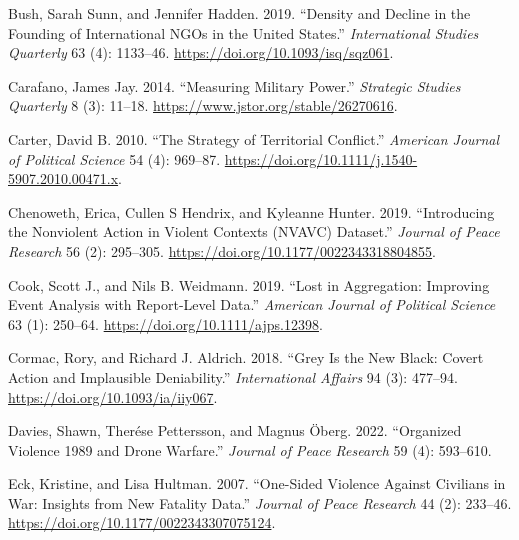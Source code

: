 \documentclass{article}
\newlength{\cslhangindent}
\newlength{\cslentryspacingunit} %
\newenvironment{CSLReferences}[2] %
 {%
  \setlength{\parindent}{0pt}
  \ifodd #1
  \let\oldpar\par
  \def\par{\hangindent=\cslhangindent\oldpar}
  \fi
  \setlength{\parskip}{#2\cslentryspacingunit}
 }%
 {}
\begin{document}
\begin{CSLReferences}{1}{0}
\leavevmode{}%
Bush, Sarah Sunn, and Jennifer Hadden. 2019. {``Density and {Decline} in
the {Founding} of {International NGOs} in the {United States}.''}
\emph{International Studies Quarterly} 63 (4): 1133--46.
\url{https://doi.org/10.1093/isq/sqz061}.

\leavevmode{}%
Carafano, James Jay. 2014. {``Measuring {Military Power}.''}
\emph{Strategic Studies Quarterly} 8 (3): 11--18.
\url{https://www.jstor.org/stable/26270616}.

\leavevmode{}%
Carter, David B. 2010. {``The {Strategy} of {Territorial Conflict}.''}
\emph{American Journal of Political Science} 54 (4): 969--87.
\url{https://doi.org/10.1111/j.1540-5907.2010.00471.x}.

\leavevmode{}%
Chenoweth, Erica, Cullen S Hendrix, and Kyleanne Hunter. 2019.
{``Introducing the {Nonviolent Action} in {Violent Contexts} ({NVAVC})
Dataset.''} \emph{Journal of Peace Research} 56 (2): 295--305.
\url{https://doi.org/10.1177/0022343318804855}.

\leavevmode{}%
Cook, Scott J., and Nils B. Weidmann. 2019. {``Lost in {Aggregation}:
{Improving Event Analysis} with {Report-Level Data}.''} \emph{American
Journal of Political Science} 63 (1): 250--64.
\url{https://doi.org/10.1111/ajps.12398}.

\leavevmode{}%
Cormac, Rory, and Richard J. Aldrich. 2018. {``Grey Is the New Black:
Covert Action and Implausible Deniability.''} \emph{International
Affairs} 94 (3): 477--94. \url{https://doi.org/10.1093/ia/iiy067}.

\leavevmode{}%
Davies, Shawn, Therése Pettersson, and Magnus Öberg. 2022. {``Organized
Violence 1989 and Drone Warfare.''} \emph{Journal of
Peace Research} 59 (4): 593--610.

\leavevmode{}%
Eck, Kristine, and Lisa Hultman. 2007. {``One-{Sided Violence Against
Civilians} in {War}: {Insights} from {New Fatality Data}.''}
\emph{Journal of Peace Research} 44 (2): 233--46.
\url{https://doi.org/10.1177/0022343307075124}.


\end{CSLReferences}
\end{document}
